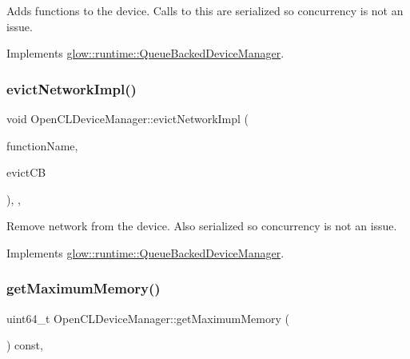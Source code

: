 Adds functions to the device. Calls to this are serialized so concurrency is not an issue. 

Implements \hyperlink{classglow_1_1runtime_1_1_queue_backed_device_manager_a47a2b12e364f822961c904c7c123924a}{glow\+::runtime\+::\+Queue\+Backed\+Device\+Manager}.

\mbox{\label{classglow_1_1runtime_1_1_open_c_l_device_manager_ab74a531a691b91c1f16ff21ae6096e33}} 
\subsubsection{\texorpdfstring{evict\+Network\+Impl()}{evictNetworkImpl()}}
{\footnotesize\ttfamily void Open\+C\+L\+Device\+Manager\+::evict\+Network\+Impl (\begin{DoxyParamCaption}\item[{std\+::string}]{function\+Name,  }\item[{Evict\+Function\+C\+B\+Ty}]{evict\+CB }\end{DoxyParamCaption})\hspace{0.3cm}{\ttfamily [override]}, {\ttfamily [protected]}, {\ttfamily [virtual]}}

Remove network from the device. Also serialized so concurrency is not an issue. 

Implements \hyperlink{classglow_1_1runtime_1_1_queue_backed_device_manager_a4b3ae3ad0f78cd72b2d35cac4a10280f}{glow\+::runtime\+::\+Queue\+Backed\+Device\+Manager}.

\mbox{\label{classglow_1_1runtime_1_1_open_c_l_device_manager_aec918b4dd4a7a0cd926844cf225db306}} 
\subsubsection{\texorpdfstring{get\+Maximum\+Memory()}{getMaximumMemory()}}
{\footnotesize\ttfamily uint64\+\_\+t Open\+C\+L\+Device\+Manager\+::get\+Maximum\+Memory (\begin{DoxyParamCaption}{ }\end{DoxyParamCaption}) const\hspace{0.3cm}{\ttfamily [override]}, {\ttfamily [virtual]}}

